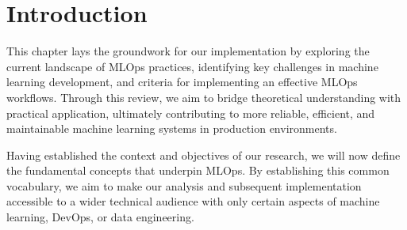\section{Introduction}\label{sec:stintro}

This chapter lays the groundwork for our implementation by exploring the current landscape of MLOps practices, identifying key challenges in machine learning development, and criteria for implementing an effective MLOps workflows.
Through this review, we aim to bridge theoretical understanding with practical application, ultimately contributing to more reliable, efficient, and maintainable machine learning systems in production environments.

Having established the context and objectives of our research, we will now define the fundamental concepts that underpin MLOps.
By establishing this common vocabulary, we aim to make our analysis and subsequent implementation accessible to a wider technical audience
with only certain aspects of machine learning, DevOps, or data engineering.